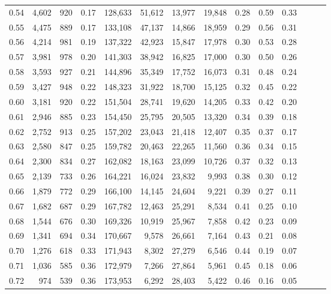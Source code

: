 \begin{tabular}{rrrrrrrrrrrrrr}
0.54 &  4,602 &  920 &  0.17 &  128,633 &   51,612 &  13,977 &  19,848 &  0.28 &  0.59 &      0.33 \\
0.55 &  4,475 &  889 &  0.17 &  133,108 &   47,137 &  14,866 &  18,959 &  0.29 &  0.56 &      0.31 \\
0.56 &  4,214 &  981 &  0.19 &  137,322 &   42,923 &  15,847 &  17,978 &  0.30 &  0.53 &      0.28 \\
0.57 &  3,981 &  978 &  0.20 &  141,303 &   38,942 &  16,825 &  17,000 &  0.30 &  0.50 &      0.26 \\
0.58 &  3,593 &  927 &  0.21 &  144,896 &   35,349 &  17,752 &  16,073 &  0.31 &  0.48 &      0.24 \\
0.59 &  3,427 &  948 &  0.22 &  148,323 &   31,922 &  18,700 &  15,125 &  0.32 &  0.45 &      0.22 \\
0.60 &  3,181 &  920 &  0.22 &  151,504 &   28,741 &  19,620 &  14,205 &  0.33 &  0.42 &      0.20 \\
0.61 &  2,946 &  885 &  0.23 &  154,450 &   25,795 &  20,505 &  13,320 &  0.34 &  0.39 &      0.18 \\
0.62 &  2,752 &  913 &  0.25 &  157,202 &   23,043 &  21,418 &  12,407 &  0.35 &  0.37 &      0.17 \\
0.63 &  2,580 &  847 &  0.25 &  159,782 &   20,463 &  22,265 &  11,560 &  0.36 &  0.34 &      0.15 \\
0.64 &  2,300 &  834 &  0.27 &  162,082 &   18,163 &  23,099 &  10,726 &  0.37 &  0.32 &      0.13 \\
0.65 &  2,139 &  733 &  0.26 &  164,221 &   16,024 &  23,832 &   9,993 &  0.38 &  0.30 &      0.12 \\
0.66 &  1,879 &  772 &  0.29 &  166,100 &   14,145 &  24,604 &   9,221 &  0.39 &  0.27 &      0.11 \\
0.67 &  1,682 &  687 &  0.29 &  167,782 &   12,463 &  25,291 &   8,534 &  0.41 &  0.25 &      0.10 \\
0.68 &  1,544 &  676 &  0.30 &  169,326 &   10,919 &  25,967 &   7,858 &  0.42 &  0.23 &      0.09 \\
0.69 &  1,341 &  694 &  0.34 &  170,667 &    9,578 &  26,661 &   7,164 &  0.43 &  0.21 &      0.08 \\
0.70 &  1,276 &  618 &  0.33 &  171,943 &    8,302 &  27,279 &   6,546 &  0.44 &  0.19 &      0.07 \\
0.71 &  1,036 &  585 &  0.36 &  172,979 &    7,266 &  27,864 &   5,961 &  0.45 &  0.18 &      0.06 \\
0.72 &    974 &  539 &  0.36 &  173,953 &    6,292 &  28,403 &   5,422 &  0.46 &  0.16 &      0.05 \\

\end{tabular}
